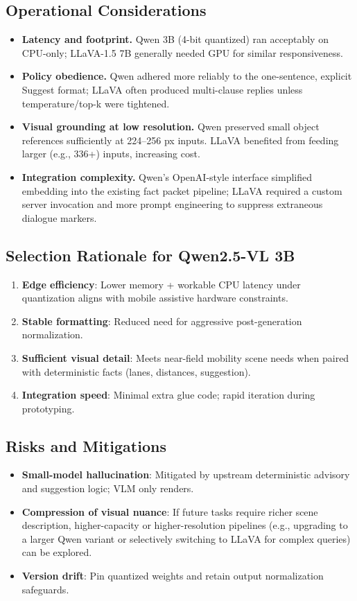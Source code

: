 \documentclass[11pt,a4paper]{article}
\begin{document}
\subsection{Operational Considerations}
\begin{itemize}[leftmargin=*]
    \item \textbf{Latency and footprint.} Qwen 3B (4-bit quantized) ran acceptably on CPU-only; LLaVA-1.5 7B generally needed GPU for similar responsiveness.
    \item \textbf{Policy obedience.} Qwen adhered more reliably to the one-sentence, explicit Suggest format; LLaVA often produced multi-clause replies unless temperature/top-k were tightened.
    \item \textbf{Visual grounding at low resolution.} Qwen preserved small object references sufficiently at 224--256 px inputs. LLaVA benefited from feeding larger (e.g., 336+) inputs, increasing cost.
    \item \textbf{Integration complexity.} Qwen’s OpenAI-style interface simplified embedding into the existing fact packet pipeline; LLaVA required a custom server invocation and more prompt engineering to suppress extraneous dialogue markers.
\end{itemize}

\subsection{Selection Rationale for Qwen2.5-VL 3B}
\begin{enumerate}[leftmargin=*]
    \item \textbf{Edge efficiency}: Lower memory + workable CPU latency under quantization aligns with mobile assistive hardware constraints.
    \item \textbf{Stable formatting}: Reduced need for aggressive post-generation normalization.
    \item \textbf{Sufficient visual detail}: Meets near-field mobility scene needs when paired with deterministic facts (lanes, distances, suggestion).
    \item \textbf{Integration speed}: Minimal extra glue code; rapid iteration during prototyping.
\end{enumerate}

\subsection{Risks and Mitigations}
\begin{itemize}[leftmargin=*]
    \item \textbf{Small-model hallucination}: Mitigated by upstream deterministic advisory and suggestion logic; VLM only renders.
    \item \textbf{Compression of visual nuance}: If future tasks require richer scene description, higher-capacity or higher-resolution pipelines (e.g., upgrading to a larger Qwen variant or selectively switching to LLaVA for complex queries) can be explored.
    \item \textbf{Version drift}: Pin quantized weights and retain output normalization safeguards.
\end{itemize}
\end{document}
